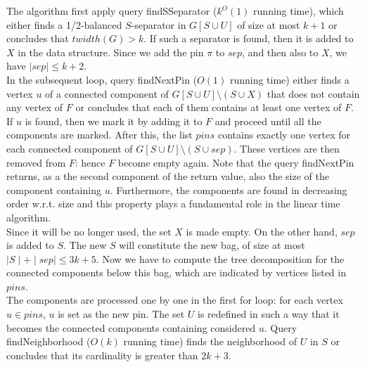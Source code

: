 \documentclass{article}
\theoremstyle{definition}
\theoremstyle{lemma}
\theoremstyle{corollary}
\theoremstyle{theorem}
\begin{document}
\bigskip
The algorithm first apply query findSSeparator ($k^O(1)$ running time), which either finds a 1/2-balanced $S$-separator in $G[S \cup U]$ of size at most $k+1$ or concludes that $twidth(G) >k$. If such a separator is found, then it is added to $X$ in the data structure. Since we add the pin $\pi$ to $sep$, and then also to $X$, we have $\mid sep \mid \leq k + 2$. \\
In the subsequent loop, query findNextPin ($O(1)$ running time) either finds a vertex $u$ of a connected component of $G[S \cup U] \setminus (S \cup X)$ that does not contain any vertex of $F$ or concludes that each of them contains at least one vertex of $F$. If $u$ is found, then we mark it by adding it to $F$ and proceed until all the components are marked. After this, the list $pins$ contains exactly one vertex for each connected component of $G[S \cup U] \setminus (S \cup sep)$. These vertices are then removed from $F$: hence $F$ become empty again. Note that the query findNextPin returns, as a the second component of the return value, also the size of the component containing $u$. Furthermore, the components are found in decreasing order w.r.t. size and this property plays a fundamental role in the linear time algorithm. \\
Since it will be no longer used, the set $X$ is made empty. On the other hand, $sep$ is added to $S$. The new $S$ will constitute the new bag, of size at most $\mid S \mid + \mid sep \mid \leq 3k + 5$. Now we have to compute the tree decomposition for the connected components below this bag, which are indicated by vertices listed in $pins$. \\
The components are processed one by one in the first for loop: for each vertex $u \in pins$, $u$ is set as the new pin. The set $U$ is redefined in such a way that it becomes the connected components containing considered $u$. Query findNeighborhood ($O(k)$ running time) finds the neighborhood of $U$ in $S$ or concludes that its cardinality is greater than $2k + 3$.
\end{document}
